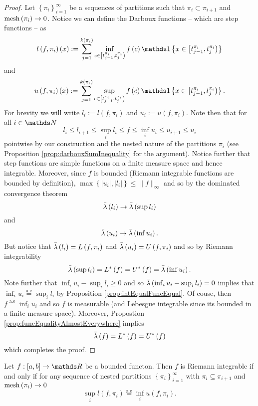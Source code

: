 \begin{proof}
Let $\left\{ \pi_{i}\right\} _{i=1}^{\infty}$ be a sequences of partitions
such that $\pi_{i}\subset\pi_{i+1}$ and $\mathrm{mesh}\left(\pi_{i}\right)\to0$.
Notice we can define the Darboux functions -- which are step functions
-- as
\[
l\left(f,\pi_{i}\right)\left(x\right):=\sum_{j=1}^{k\left(\pi_{i}\right)}\inf_{c\in\left[t_{j-1}^{\pi_{i}},t_{j}^{\pi_{i}}\right)}f\left(c\right)\indicate\left\{ x\in\left[t_{j-1}^{\pi_{i}},t_{j}^{\pi_{i}}\right)\right\} 
\]
and
\[
u\left(f,\pi_{i}\right)\left(x\right):=\sum_{j=1}^{k\left(\pi_{i}\right)}\sup_{c\in\left[t_{j-1}^{\pi_{i}},t_{j}^{\pi_{i}}\right)}f\left(c\right)\indicate\left\{ x\in\left[t_{j-1}^{\pi_{i}},t_{j}^{\pi_{i}}\right)\right\} .
\]
For brevity we will write $l_{i}:=l\left(f,\pi_{i}\right)$ and $u_{i}:=u\left(f,\pi_{i}\right)$.
Note then that for all $i\in\N$
\[
l_{i}\leq l_{i+1}\leq\sup_{i}l_{i}\leq f\leq\inf_{i}u_{i}\leq u_{i+1}\leq u_{i}
\]
pointwise by our construction and the nested nature of the partitions
$\pi_{i}$ (see Proposition \ref{prop:darbouxSumInequality} for the
argument). Notice further that step functions are simple functions
on a finite measure space and hence integrable. Moreover, since $f$
is bounded (Riemann integrable functions are bounded by definition),
$\max\left\{ \lvert u_{i}\rvert,\lvert l_{i}\rvert\right\} \leq\lVert f\rVert_{\infty}$
and so by the dominated convergence theorem
\[
\bar{\lambda}\left(l_{i}\right)\to\bar{\lambda}\left(\sup l_{i}\right)
\]
and 
\[
\bar{\lambda}\left(u_{i}\right)\to\bar{\lambda}\left(\inf u_{i}\right).
\]
But notice that $\bar{\lambda}\left(l_{i}\right)=L\left(f,\pi_{i}\right)$
and $\bar{\lambda}\left(u_{i}\right)=U\left(f,\pi_{i}\right)$ and so by Riemann
integrability
\[
\bar{\lambda}\left(\sup l_{i}\right)=L^{*}\left(f\right)=U^{*}\left(f\right)=\bar{\lambda}\left(\inf u_{i}\right).
\]
Note further that $\inf_{i}u_{i}-\sup_{i}l_{i}\geq0$ and so $\bar{\lambda}\left(\inf_{i}u_{i}-\sup_{i}l_{i}\right)=0$
implies that $\inf_{i}u_{i}\stackrel{\text{a.e}}{=}\sup_{i}l_{i}$
by Proposition \ref{prop:intEqualFuncEqual}. Of couse, then $f\stackrel{\text{a.e}}{=}\inf_{i}u_{i}$
and so $f$ is measurable (and Lebesgue integrable since its bounded
in a finite measure space). Moreover, Propostion \ref{prop:funcEqualityAlmostEverywhere}
implies
\[
\bar{\lambda}\left(f\right)=L^{*}\left(f\right)=U^{*}\left(f\right)
\]
which completes the proof.
\end{proof}
\begin{cor}
\label{cor:charRiemannIntegrable}Let $f:\left[a,b\right]\to\R$ be
a bounded functon. Then $f$ is Riemann integrable if and only if
for any sequence of nested partitions $\left\{ \pi_{i}\right\} _{i=1}^{\infty}$
with $\pi_{i}\subseteq\pi_{i+1}$ and $\mathrm{mesh}\left(\pi_{i}\right)\to0$
\[
\sup_{i}l\left(f,\pi_{i}\right)\stackrel{\text{a.e}}{=}\inf_{i}u\left(f,\pi_{i}\right).
\]
\end{cor}

